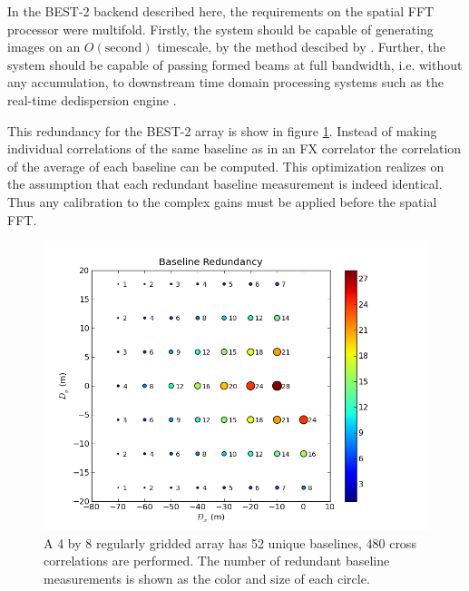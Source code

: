 \documentclass[useAMS,macros,usenatbib,onecolumn]{mn2e}
\begin{document}
In the BEST-2 backend described here, the requirements on the spatial FFT processor were multifold. Firstly, the system should be capable of generating images on an $O(\mathrm{second})$ timescale, by the method descibed by \citep{fftt}. Further, the system should be capable of passing formed beams at full bandwidth, i.e. without any accumulation, to downstream time domain processing systems such as the real-time dedispersion engine \citep{dedispersion}. 


This redundancy for the BEST-2 array is show in figure \ref{fig:redbl}.
Instead of making individual correlations of the same baseline as in an FX correlator the correlation of the average of each baseline can be computed.
This optimization realizes on the assumption that each redundant baseline measurement is indeed identical.
Thus any calibration to the complex gains must be applied before the spatial FFT.

\begin{figure}
    \centering
    \includegraphics[scale=0.6]{graphics/redbl.png}
    \caption{A 4 by 8 regularly gridded array has 52 unique baselines, 480 cross correlations are performed. The number of redundant baseline measurements is shown as the color and size of each circle.}
    \label{fig:redbl}
\end{figure}
\end{document}
